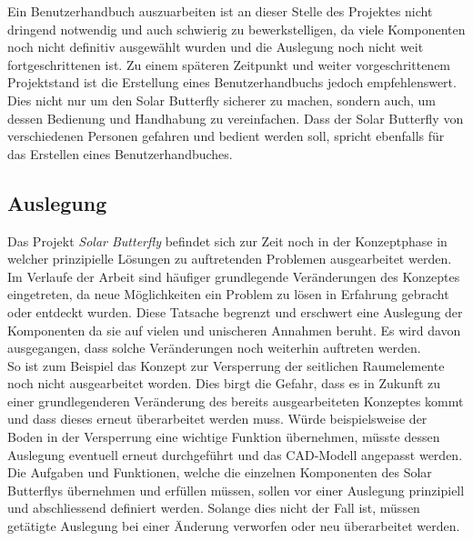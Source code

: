 Ein Benutzerhandbuch auszuarbeiten ist an dieser Stelle des Projektes nicht dringend notwendig und auch schwierig zu bewerkstelligen, da viele Komponenten noch nicht definitiv ausgewählt wurden und die Auslegung noch nicht weit fortgeschrittenen ist. Zu einem späteren Zeitpunkt und weiter vorgeschrittenem Projektstand ist die Erstellung eines Benutzerhandbuchs jedoch empfehlenswert. Dies nicht nur um den Solar Butterfly sicherer zu machen, sondern auch, um dessen Bedienung und Handhabung zu vereinfachen. Dass der Solar Butterfly von verschiedenen Personen gefahren und bedient werden soll, spricht ebenfalls für das Erstellen eines Benutzerhandbuches.


\subsection{Auslegung}
Das Projekt \emph{Solar Butterfly} befindet sich zur Zeit noch in der Konzeptphase in welcher prinzipielle Lösungen zu auftretenden Problemen ausgearbeitet werden. Im Verlaufe der Arbeit sind häufiger grundlegende Veränderungen des Konzeptes eingetreten, da neue Möglichkeiten ein Problem zu lösen in Erfahrung gebracht oder entdeckt wurden. Diese Tatsache begrenzt und erschwert eine Auslegung der Komponenten da sie auf vielen und unischeren Annahmen beruht. Es wird davon ausgegangen, dass solche Veränderungen noch weiterhin auftreten werden.\\
So ist zum Beispiel das Konzept zur Versperrung der seitlichen Raumelemente noch nicht ausgearbeitet worden. Dies birgt die Gefahr, dass es in Zukunft zu einer grundlegenderen Veränderung des bereits ausgearbeiteten Konzeptes kommt und dass dieses erneut überarbeitet werden muss. Würde beispielsweise der Boden in der Versperrung eine wichtige Funktion übernehmen, müsste dessen Auslegung eventuell erneut durchgeführt und das CAD-Modell angepasst werden.\\
Die Aufgaben und Funktionen, welche die einzelnen Komponenten des Solar Butterflys übernehmen und erfüllen müssen, sollen vor einer Auslegung prinzipiell und abschliessend definiert werden. Solange dies nicht der Fall ist, müssen getätigte Auslegung bei einer Änderung verworfen oder neu überarbeitet werden.

